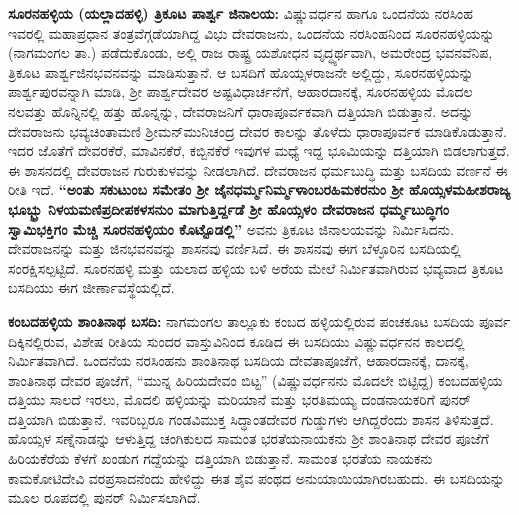 \textbf{ಸೂರನಹಳ್ಳಿಯ (ಯಲ್ಲಾದಹಳ್ಳಿ) ತ್ರಿಕೂಟ ಪಾರ್ಶ್ವ ಜಿನಾಲಯ:} ವಿಷ್ಣುವರ್ಧನ ಹಾಗೂ ಒಂದನೆಯ ನರಸಿಂಹ ಇವರಲ್ಲಿ ಮಹಾಪ್ರಧಾನ ತಂತ್ರವೆಗ್ಗಡೆಯಾಗಿದ್ದ ವಿಭು ದೇವರಾಜನು, ಒಂದನೆಯ ನರಸಿಂಹನಿಂದ ಸೂರನಹಳ್ಳಿಯನ್ನು (ನಾಗಮಂಗಲ ತಾ.) ಪಡೆದುಕೊಂಡು, ಅಲ್ಲಿ ರಾಜ ರಾಷ್ಟ್ರ ಯಶೋಧನ ವೃದ್ಧ್ಯರ್ಥವಾಗಿ, ಅಮರೇಂದ್ರ ಭವನವೆನಿಪ, ತ್ರಿಕೂಟ ಪಾರ್ಶ್ವಜಿನಭವನ\-ವನ್ನು ಮಾಡಿಸುತ್ತಾನೆ. ಆ ಬಸದಿಗೆ ಹೊಯ್ಸಳರಾಜನೇ ಅಲ್ಲಿದ್ದು, ಸೂರನಹಳ್ಳಿಯನ್ನು ಪಾರ್ಶ್ವಪುರವನ್ನಾಗಿ ಮಾಡಿ, ಶ‍್ರೀ ಪಾರ್ಶ್ವದೇವರ ಅಷ್ಟವಿಧಾರ್ಚನೆಗೆ, ಆಹಾರದಾನಕ್ಕೆ, ಸೂರನಹಳ್ಳಿಯ ಮೊದಲ ನಲವತ್ತು ಹೊನ್ನಿನಲ್ಲಿ ಹತ್ತು ಹೊನ್ನನ್ನು, ದೇವರಾಜನಿಗೆ ಧಾರಾಪೂರ್ವಕವಾಗಿ ದತ್ತಿಯಾಗಿ ಬಿಡುತ್ತಾನೆ. ಅದನ್ನು ದೇವರಾಜನು ಭವ್ಯಚಿಂತಾಮಣಿ ಶ‍್ರೀಮನ್​ಮುನಿಚಂದ್ರ ದೇವರ ಕಾಲನ್ನು ತೊಳೆದು ಧಾರಾಪೂರ್ವಕ ಮಾಡಿಕೊಡುತ್ತಾನೆ. ಇದರ ಜೊತೆಗೆ ದೇವರಕೆರೆ, ಮಾವಿನಕೆರೆ, ಕಬ್ಬಿನಕೆರೆ ಇವುಗಳ ಮಧ್ಯೆ ಇದ್ದ ಭೂಮಿಯನ್ನು ದತ್ತಿಯಾಗಿ ಬಿಡಲಾಗುತ್ತದೆ. ಈ ಶಾಸನದಲ್ಲಿ ದೇವರಾಜನ ಗುರುಕುಳವನ್ನು ನೀಡಲಾಗಿದೆ. ದೇವರಾಜನ ಧರ್ಮಬುದ್ಧಿ ಮತ್ತು ಬಸದಿಯ ವರ್ಣನೆ ಈ ರೀತಿ ಇದೆ. \textbf{“ಅಂತು \hbox{ಸಕುಟುಂಬ} ಸಮೇತಂ ಶ‍್ರೀ ಜೈನಧರ್ಮ್ಮನಿರ್ಮ್ಮಳಾಂಬರಹಿಮಕರನುಂ ಶ‍್ರೀ ಹೊಯ್ಸಳಮಹೀಶರಾಜ್ಯ ಭೂಭ್ಭ್ರು ನಿಳಯಮಣಿಪ್ರದೀಪಕಳಸನುಂ ಮಾಗುತ್ತಿರ್ದ್ದಡೆ ಶ‍್ರೀ ಹೊಯ್ಸಳಂ ದೇವರಾಜನ ಧರ್ಮ್ಮಬುದ್ಧಿಗಂ ಸ್ವಾಮಿಭಕ್ತಿಗಂ ಮೆಚ್ಚಿ ಸೂರನಹಳ್ಳಿಯಂ ಕೊಟ್ಟೊಡಲ್ಲಿ” }ಅವನು ತ್ರಿಕೂಟ ಜಿನಾಲಯವನ್ನು ನಿರ್ಮಿಸಿದನು. ದೇವರಾಜನನ್ನು ಮತ್ತು ಜಿನಭವನವನ್ನು ಶಾಸನವು ವರ್ಣಿಸಿದೆ. ಈ ಶಾಸನವು ಈಗ ಬೆಳ್ಳೂರಿನ ಬಸದಿಯಲ್ಲಿ ಸಂರಕ್ಷಿಸಲ್ಪಟ್ಟಿದೆ. ಸೂರನಹಳ್ಳಿ ಮತ್ತು ಯಲಾದ ಹಳ್ಳಿಯ ಬಳಿ ಅರೆಯ ಮೇಲೆ ನಿರ್ಮಿತವಾಗಿರುವ ಭವ್ಯವಾದ ತ್ರಿಕೂಟ ಬಸದಿಯು ಈಗ ಜೀರ್ಣಾವಸ್ಥೆಯಲ್ಲಿದೆ.

\textbf{ಕಂಬದಹಳ್ಳಿಯ ಶಾಂತಿನಾಥ ಬಸದಿ:} ನಾಗಮಂಗಲ ತಾಲ್ಲೂಕು ಕಂಬದ ಹಳ್ಳಿಯಲ್ಲಿರುವ ಪಂಚಕೂಟ ಬಸದಿಯ ಪೂರ್ವ ದಿಕ್ಕಿನಲ್ಲಿರುವ, ವಿಶೇಷ ರೀತಿಯ ಸುಂದರ ವಾಸ್ತುವಿನಿಂದ ಕೂಡಿದ ಈ ಬಸದಿಯು ವಿಷ್ಣುವರ್ಧನನ ಕಾಲದಲ್ಲಿ ನಿರ್ಮಿತವಾಗಿದೆ. ಒಂದನೆಯ ನರಸಿಂಹನು ಶಾಂತಿನಾಥ ಬಸದಿಯ ದೇವತಾಪೂಜೆಗೆ, ಆಹಾರದಾನಕ್ಕೆ, ದಾನಕ್ಕೆ, ಶಾಂತಿನಾಥ ದೇವರ ಪೂಜೆಗೆ, “ಮುನ್ನ ಹಿರಿಯದೇವಂ ಬಿಟ್ಟ” (ವಿಷ್ಣುವರ್ಧನನು ಮೊದಲೇ ಬಿಟ್ಟಿದ್ದ) ಕಂಬದಹಳ್ಳಿಯ ದತ್ತಿಯು ಸಾಲದೆ ಇರಲು, ಮೊದಲಿ ಹಳ್ಳಿಯನ್ನು ಮರಿಯಾನೆ ಮತ್ತು ಭರತಿಮಯ್ಯ ದಂಡನಾಯಕರಿಗೆ ಪುನರ್​ದತ್ತಿಯಾಗಿ ಬಿಡುತ್ತಾನೆ. ಇವರಿಬ್ಬರೂ ಗಂಡವಿಮುಕ್ತ ಸಿದ್ಧಾಂತದೇವರ ಗುಡ್ಡುಗಳು ಆಗಿದ್ದರೆಂದು ಶಾಸನ ತಿಳಿಸುತ್ತದೆ. ಹೊಯ್ಸಳ ಸಣ್ನೆನಾಡನ್ನು ಆಳುತ್ತಿದ್ದ ಚಂಗಿಕುಲದ ಸಾಮಂತ ಭರತೆಯನಾಯಕನು ಶ‍್ರೀ ಶಾಂತಿನಾಥ ದೇವರ ಪೂಜೆಗೆ ಹಿರಿಯಕೆರೆಯ ಕೆಳಗೆ ಖಂಡುಗ ಗದ್ದೆಯನ್ನು ದತ್ತಿಯಾಗಿ ಬಿಡುತ್ತಾನೆ. ಸಾಮಂತ ಭರತೆಯ ನಾಯಕನು ಕಾಮಕೋಟಿದೇವಿ ವರಪ್ರಸಾದನೆಂದು ಹೇಳಿದ್ದು ಈತ ಶೈವ ಪಂಥದ ಅನುಯಾಯಿಯಾಗಿರಬಹುದು. ಈ ಬಸದಿಯನ್ನು ಮೂಲ ರೂಪದಲ್ಲಿ ಪುನರ್ ನಿರ್ಮಿಸಲಾಗಿದೆ.

